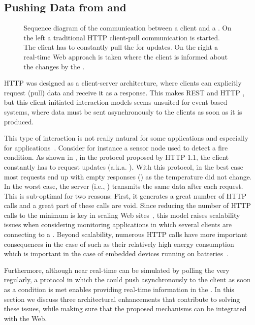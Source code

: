 \subsection{Pushing Data from \stsBig{} and \sgs{}}\label{push}
\begin{figure}
\caption{Sequence diagram of the communication between a client and a \st{}. On the left a traditional HTTP client-pull communication is started. The client has to constantly pull the \sts{} for updates. On the right a real-time Web approach is taken where the client is informed about the changes by the \sts{}.}
\label{fig:clientServer}
\end{figure}
HTTP was designed as a client-server architecture, where clients can explicitly request (pull) data and receive it as a response. This makes REST and HTTP  \sts{}, but this client-initiated interaction models seems unsuited for event-based systems, where data must be sent asynchronously to the clients as soon as it is produced.

This type of interaction is not really natural for some \sts{} applications and especially for  applications~\cite{Duquennoy2009a,Trifa2010}. Consider for instance a sensor node used to detect a fire condition. As shown in , in the protocol proposed by HTTP 1.1, the client constantly has to request updates (a.k.a. ). With this protocol, in the best case most requests end up with empty responses () as the temperature did not change. In the worst case, the server (i.e., \st{}) transmits the same data after each request. This is sub-optimal for two reasons: First, it generates a great number of HTTP calls and a great part of these calls are void. Since reducing the number of HTTP calls to the minimum is key in scaling Web sites~\cite{Souders2007}, this model raises scalability issues when considering monitoring applications in which several clients are connecting to a \st{}. Beyond scalability, numerous HTTP calls have more important consequences in the case of \sts{} such as their relatively high energy consumption which is important in the case of embedded devices running on batteries~\cite{Yazar2009}. 

Furthermore, although near real-time can be simulated by polling the \sts{} very regularly, a protocol in which the \sts{} could push asynchronously to the client as soon as a condition is met enables providing real-time information in the \WoT{}. In this section we discuss three architectural enhancements that contribute to solving these issues, while making sure that the proposed mechanisms can be integrated with the Web.


